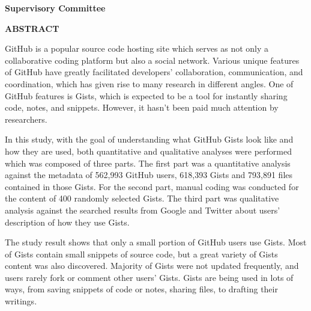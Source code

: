 \newpage
{}

\noindent \textbf{Supervisory Committee}
\tpbreak
\panel

\begin{center}
\textbf{ABSTRACT}
\end{center}

GitHub is a popular source code hosting site which serves as not only a collaborative coding platform but also a social network. Various unique features of GitHub have greatly facilitated developers' collaboration, communication, and coordination, which has given rise to many research in different angles. One of GitHub features is Gists, which is expected to be a tool for instantly sharing code, notes, and snippets. However, it hasn't been paid much attention by researchers. 

In this study, with the goal of understanding what GitHub Gists look like and how they are used, both quantitative and qualitative analyses were performed which was composed of three parts. The first part was a quantitative analysis against the metadata of 562,993 GitHub users, 618,393 Gists and 793,891 files contained in those Gists. For the second part, manual coding was conducted for the content of 400 randomly selected Gists. The third part was qualitative analysis against the searched results from Google and Twitter about users' description of how they use Gists. 

The study result shows that only a small portion of GitHub users use Gists. Most of Gists contain small snippets of source code, but a great variety of Gists content was also discovered. Majority of Gists were not updated frequently, and users rarely fork or comment other users' Gists. Gists are being used in lots of ways, from saving snippets of code or notes, sharing files, to drafting their writings.
